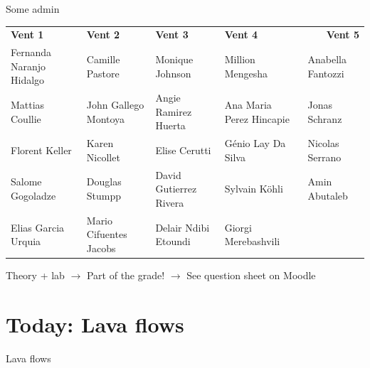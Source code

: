 \documentclass[10pt,aspectratio=169]{beamer}
\begin{document}
\begin{frame}{Some admin}
  \scriptsize
  \begin{table}[htbp]
    \centering
      \begin{tabular}{llllr}
      \textbf{\alert{Vent 1}} & \textbf{\alert{Vent 2}} & \textbf{\alert{Vent 3}} & \textbf{\alert{Vent 4}} & \textbf{\alert{Vent 5}} \\ 
      Fernanda Naranjo Hidalgo & Camille Pastore & Monique Johnson & Million Mengesha & \multicolumn{1}{l}{Anabella Fantozzi} \\
      Mattias Coullie & John Gallego Montoya & Angie Ramirez Huerta & Ana Maria Perez Hincapie & \multicolumn{1}{l}{Jonas Schranz} \\
      Florent Keller & Karen Nicollet & Elise Cerutti & Génio Lay Da Silva & \multicolumn{1}{l}{Nicolas Serrano} \\
      Salome Gogoladze & Douglas Stumpp & David Gutierrez Rivera & Sylvain Köhli & \multicolumn{1}{l}{Amin Abutaleb} \\
      Elias Garcia Urquia & Mario Cifuentes Jacobs & Delair Ndibi Etoundi & Giorgi Merebashvili &  \\
      \end{tabular}%
    \label{tab:addlabel}%
  \end{table}%
  \vspace*{2em}
  \normalsize
    \centering Theory + lab $\rightarrow$ \alert{Part of the grade!} $\rightarrow$ See question sheet on Moodle
  
\end{frame}


\section{Today: \alert{Lava flows}}

\begin{frame}{Lava flows}
\end{frame}

\end{document}

